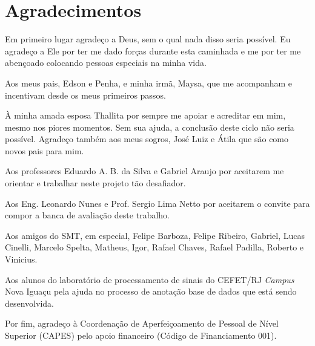 \chapter*{Agradecimentos}

Em primeiro lugar agradeço a Deus, sem o qual nada disso seria possível.
Eu agradeço a Ele por ter me dado forças durante esta caminhada e me por ter me abençoado colocando pessoas especiais na minha vida.

Aos meus pais, Edson e Penha, e minha irmã, Maysa, que me acompanham e incentivam desde os meus primeiros passos.

À minha amada esposa Thallita por sempre me apoiar e acreditar em mim, mesmo nos piores momentos.
Sem sua ajuda, a conclusão deste ciclo não seria possível.
Agradeço também aos meus sogros, José Luiz e Átila que são como novos pais para mim.

Aos professores Eduardo A. B. da Silva e Gabriel Araujo por aceitarem me orientar e trabalhar neste projeto tão desafiador.

Aos Eng. Leonardo Nunes e Prof. Sergio Lima Netto por aceitarem o convite para compor a banca de avaliação deste trabalho.

Aos amigos do SMT, em especial, Felipe Barboza, Felipe Ribeiro, Gabriel, Lucas Cinelli, Marcelo Spelta, Matheus, Igor, Rafael Chaves, Rafael Padilla, Roberto e Vinicius.

Aos alunos do laboratório de processamento de sinais do CEFET/RJ \textit{Campus} Nova Iguaçu
pela ajuda no processo de anotação base de dados que está sendo desenvolvida.


Por fim, agradeço à Coordenação de Aperfeiçoamento de Pessoal de Nível Superior (CAPES) pelo apoio financeiro (Código de Financiamento 001).



